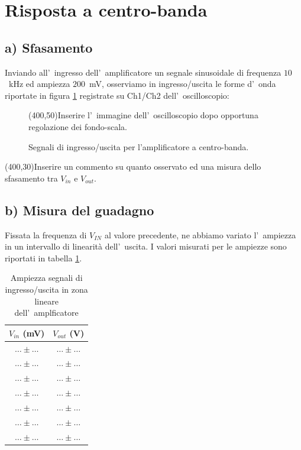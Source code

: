 \documentclass[10pt,a4paper]{article}
\begin{document}
\section{Risposta a centro-banda}
\subsection*{a) Sfasamento}
Inviando all'~ingresso dell'~amplificatore un segnale sinusoidale di frequenza $10$~kHz ed ampiezza $200$~mV, osserviamo in 
ingresso/uscita le forme d'~onda riportate in figura \ref{fig:osci} registrate su Ch1/Ch2 dell'~oscilloscopio:
\begin{figure}[htp]
\centering
\framebox(400,50){Inserire l'~immagine dell'~oscilloscopio dopo opportuna regolazione dei fondo-scala.}
\caption{Segnali di ingresso/uscita per l'amplificatore a centro-banda.}
\label{fig:osci}
\end{figure}
\vspace{0.5cm}
\framebox(400,30){Inserire un commento su quanto osservato ed una misura dello sfasamento tra $V_{in}$ e $V_{out}$.}

\subsection*{b) Misura del guadagno}
Fissata la frequenza di $V_{IN}$ al valore precedente, ne abbiamo variato l'~ampiezza in un intervallo di linearit\`a dell'~uscita. I 
valori misurati per le ampiezze sono riportati in tabella \ref{tab:lin}.   

\begin{table}[h]
\caption{Ampiezza segnali di ingresso/uscita in zona lineare dell'~amplficatore}
\label{tab:lin}
\begin{center}
\begin{tabular}{|c|c|}
\hline 
\hline 
$V_{in}$ (mV)  & $V_{out}$ (V)\\
\hline 
$\ldots \pm \ldots$ & $\ldots \pm \ldots$  \\
\hline 
$\ldots \pm \ldots$ & $\ldots \pm \ldots$  \\
\hline 
$\ldots \pm \ldots$ & $\ldots \pm \ldots$  \\
\hline 
$\ldots \pm \ldots$ & $\ldots \pm \ldots$  \\
\hline 
$\ldots \pm \ldots$ & $\ldots \pm \ldots$  \\
\hline 
$\ldots \pm \ldots$ & $\ldots \pm \ldots$  \\
\hline 
$\ldots \pm \ldots$ & $\ldots \pm \ldots$  \\
\hline 
\hline 
\end{tabular} 
\end{center}
\end{table}
\end{document}
